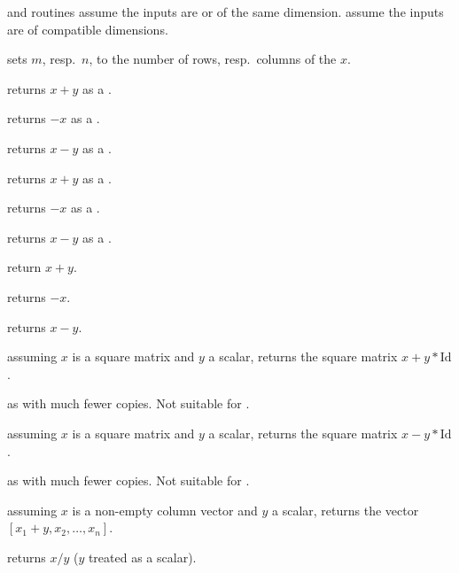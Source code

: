 

 and  routines assume the inputs are  or 
of the same dimension.  assume the inputs are  of
compatible dimensions.


 sets $m$, resp.~$n$, to
the number of rows, resp.~columns of the  $x$.

 returns $x + y$ as a .

 returns $-x$ as a .

 returns $x - y$ as a .

 returns $x + y$ as a .

 returns $-x$ as a .

 returns $x - y$ as a .

 return $x+y$.

 returns $-x$.

 returns $x-y$.

 assuming $x$ is a square matrix
and $y$ a scalar, returns the square matrix $x + y*\text{Id}$.

 as  with much
fewer copies. Not suitable for .

 assuming $x$ is a square matrix
and $y$ a scalar, returns the square matrix $x - y*\text{Id}$.

 as  with much
fewer copies. Not suitable for .

 assuming $x$ is a non-empty column vector
and $y$ a scalar, returns the vector $[x_1 + y, x_2,\dots,x_n]$.


 returns $x/y$ ($y$ treated as a scalar).


